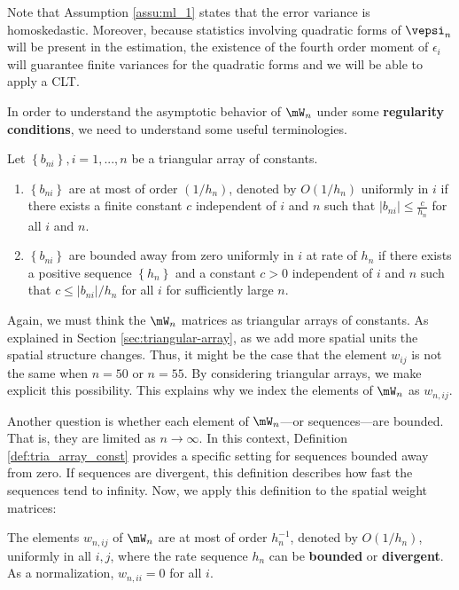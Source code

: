\documentclass[english,12pt]{book}\usepackage[]{graphicx}\usepackage[]{xcolor}
\begin{document}
Note that Assumption \ref{assu:ml_1} states that the error variance is homoskedastic. Moreover, because statistics involving quadratic forms of $\vepsi_n$ will be present in the estimation, the existence of the fourth order moment of $\epsilon_{i}$ will guarantee finite variances for the quadratic forms and we will be able to apply a CLT. 

In order to understand the asymptotic behavior of $\mW_n$ under some \textbf{regularity conditions}, we need to understand some useful terminologies.

\begin{definition}\label{def:tria_array_const}
Let $\left\lbrace b_{ni} \right\rbrace, i = 1,...,n$ be a triangular array of constants.

\begin{enumerate}
  \item $\left\lbrace b_{ni} \right\rbrace$ are at most of order $(1/h_n)$, denoted by $O(1/h_n)$ uniformly in $i$ if there exists a finite constant $c$ independent of $i$ and $n$ such that $\left|b_{ni}\right|\leq \frac{c}{h_n}$ for all $i$ and $n$.
  \item $\left\lbrace b_{ni} \right\rbrace$ are bounded away from zero uniformly in $i$ at rate of $h_n$ if there exists a positive sequence $\left\lbrace h_{n} \right\rbrace$ and a constant $c>0$ independent of $i$ and $n$ such that $c\leq \left|b_{ni}\right|/ h_n$ for all $i$ for sufficiently large $n$.
\end{enumerate}
\end{definition}

Again, we must think the $\mW_n$ matrices as triangular arrays of constants. As explained in Section \ref{sec:triangular-array}, as we add more spatial units the spatial structure changes. Thus, it might be the case that the element $w_{ij}$ is not the same when $n = 50$ or $n = 55$. By considering triangular arrays, we make explicit this possibility. This explains why we index the elements of $\mW_n$ as $w_{n, ij}$.

Another question is whether each element of $\mW_n$---or sequences---are bounded. That is, they are limited as $n\to \infty$. In this context, Definition \ref{def:tria_array_const} provides a specific setting for sequences bounded away from zero. If sequences are divergent, this definition describes how fast the sequences tend to infinity. Now, we apply this definition to the spatial weight matrices:

\begin{assumption}\label{assu:ml_2}
	The elements $w_{n,ij}$ of $\mW_n$ are at most of order $h_n^{-1}$, denoted by $O(1/h_n)$, uniformly in all $i,j$, where the rate sequence ${h_n}$ can be \textbf{bounded} or \textbf{divergent}. As a normalization, $w_{n,ii} = 0$ for all $i$.
\end{assumption}
\end{document}
